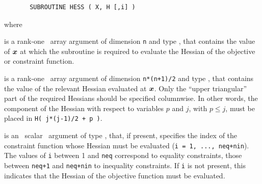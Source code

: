 \documentclass{galahad}
\begin{document}
\def\baselinestretch{0.8}
{\tt \begin{verbatim}
       SUBROUTINE HESS ( X, H [,i] )
\end{verbatim} }
\def\baselinestretch{1.0}
\noindent
where
\begin{description}
 is a rank-one \intentin\ array argument of
dimension {\tt n} and type \realdp,
that contains the value of ${\bm{x}}$ at which the
subroutine is required to evaluate the Hessian
of the objective or constraint function.

 is a rank-one \intentout\ array argument of dimension {\tt n*(n+1)/2}
  and type \realdp, that contains the value of the relevant
  Hessian evaluated at ${\bm{x}}$. Only the ``upper triangular'' part of the
  required Hessians should be specified columnwise. In other words, the
  component of the Hessian with respect to  variables $p$ and $j$, with
  $p \leq j$, must be  placed in {\tt H( j*(j-1)/2 + p )}.

 is an \optional\ scalar \intentin\ argument of type \integer,
that, if present, specifies the index of the constraint function whose
Hessian must be evaluated  ({\tt i = 1, ..., neq+nin}). The values of {\tt i}
between 1 and {\tt neq} correspond to equality constraints, those between
{\tt neq+1} and {\tt neq+nin} to inequality constraints.
If {\tt i} is not
present, this indicates that the Hessian of the objective function must be
evaluated.
\end{description}

\galerrors\label{serrors}
\end{document}
